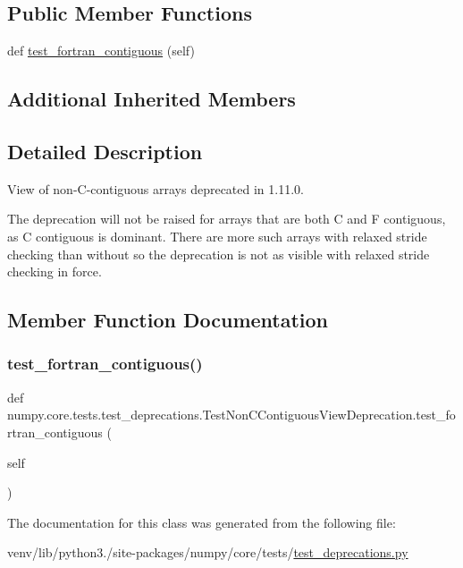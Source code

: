 \subsection*{Public Member Functions}
\begin{DoxyCompactItemize}
\item 
def \hyperlink{classnumpy_1_1core_1_1tests_1_1test__deprecations_1_1TestNonCContiguousViewDeprecation_a13382498e1f114eccae932373a6cda7e}{test\+\_\+fortran\+\_\+contiguous} (self)
\end{DoxyCompactItemize}
\subsection*{Additional Inherited Members}


\subsection{Detailed Description}
\begin{DoxyVerb}View of non-C-contiguous arrays deprecated in 1.11.0.

The deprecation will not be raised for arrays that are both C and F
contiguous, as C contiguous is dominant. There are more such arrays
with relaxed stride checking than without so the deprecation is not
as visible with relaxed stride checking in force.
\end{DoxyVerb}
 

\subsection{Member Function Documentation}
\mbox{\label{classnumpy_1_1core_1_1tests_1_1test__deprecations_1_1TestNonCContiguousViewDeprecation_a13382498e1f114eccae932373a6cda7e}} 
\subsubsection{\texorpdfstring{test\+\_\+fortran\+\_\+contiguous()}{test\_fortran\_contiguous()}}
{\footnotesize\ttfamily def numpy.\+core.\+tests.\+test\+\_\+deprecations.\+Test\+Non\+C\+Contiguous\+View\+Deprecation.\+test\+\_\+fortran\+\_\+contiguous (\begin{DoxyParamCaption}\item[{}]{self }\end{DoxyParamCaption})}



The documentation for this class was generated from the following file\+:\begin{DoxyCompactItemize}
\item 
venv/lib/python3./site-\/packages/numpy/core/tests/\hyperlink{core_2tests_2test__deprecations_8py}{test\+\_\+deprecations.\+py}\end{DoxyCompactItemize}
